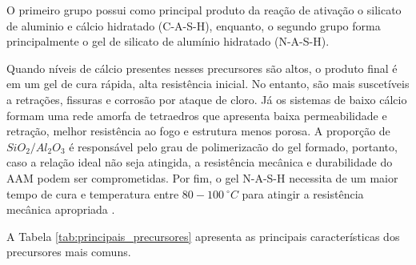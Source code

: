 O primeiro grupo possui como principal produto da reação de ativação o silicato de aluminio e cálcio hidratado (C-A-S-H), enquanto, o segundo grupo forma principalmente o gel de silicato de alumínio hidratado (N-A-S-H).

Quando níveis de cálcio presentes nesses precursores são altos, o produto final é em um gel de cura rápida, alta resistência inicial. No entanto, são mais suscetíveis a retrações, fissuras e corrosão por ataque de cloro.
Já os sistemas de baixo cálcio formam uma rede amorfa de tetraedros que apresenta baixa permeabilidade e retração, melhor resistência ao fogo e estrutura menos porosa.
A proporção de $SiO_2/Al_2O_3$ é responsável pelo grau de polimerizacão do gel formado, portanto, caso a relação ideal não seja atingida, a resistência mecânica e durabilidade do AAM podem ser comprometidas.
Por fim, o gel N-A-S-H necessita de um maior tempo de cura e temperatura entre $80-100\ ^\circ C$ para atingir a resistência mecânica apropriada \cite{Nodehi2021}.

A Tabela \ref{tab:principais_precursores} apresenta as principais características dos precursores mais comuns.

